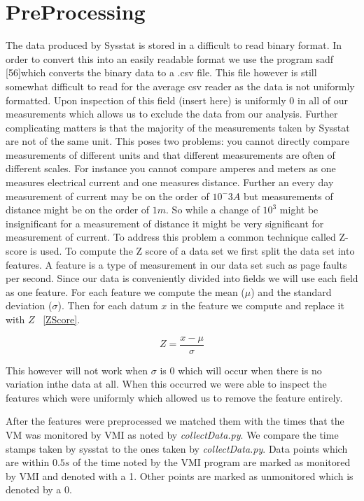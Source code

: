 \section{PreProcessing}

The data produced by Sysstat is stored in a difficult to read binary format. In order to convert this into an easily readable format we use the program sadf [56]which converts the binary data to a .csv file. This file however is still somewhat difficult to read for the average csv reader as the data is not uniformly formatted.  Upon inspection of this field (insert here) is uniformly 0 in all of our measurements which allows us to exclude the data from our analysis. Further complicating matters is that the majority of the measurements taken by Sysstat are not of the same unit. This poses two problems: you cannot directly compare measurements of different units and that different measurements are often of different scales. For instance you cannot compare amperes and meters as one measures electrical current and one measures distance. Further an every day measurement of current may be on the order of $10^-3A$ but measurements of distance might be on the order of $1m$. So while a change of $10^3$ might be insignificant for a measurement of distance it might be very significant for measurement of current. To address this problem a common technique called Z-score is used. To compute the Z score of a data set we first split the data set into features. A feature is a type of measurement in our data set such as page faults per second. Since our data is conveniently divided into fields we will use each field as one feature. For each feature we compute the mean ($\mu$) and the standard deviation ($\sigma$). Then for each datum $x$ in the feature we compute and replace it with $Z$ ~\ref{ZScore}.


\begin{equation}\label{ZScore}
	Z = \frac{x-\mu}{\sigma}
\end{equation}


This however will not work when $\sigma$ is 0 which will occur when there is no variation inthe data at all. When this occurred we were able to inspect the features which were uniformly which allowed us to remove the feature entirely. 

After the features were preprocessed we matched them with the times that the VM was monitored by VMI as noted by \textit{collectData.py}. We compare the time stamps taken by sysstat to the ones taken by \textit{collectData.py}. Data points which are within $0.5s$ of the time noted by the VMI program are marked as monitored by VMI and denoted with a 1. Other points are marked as unmonitored which is denoted by a 0. 

